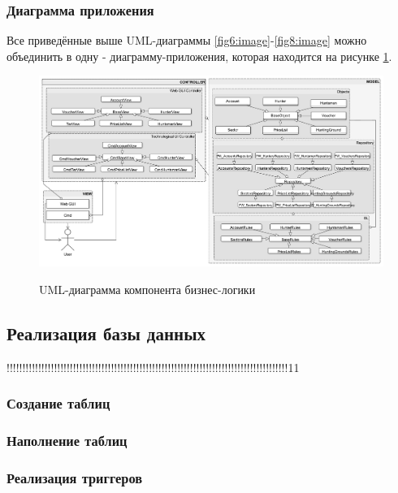 		\subsubsection{Диаграмма приложения}
		Все приведённые выше UML-диаграммы \ref{fig6:image}-\ref{fig8:image} можно объединить в одну - диаграмму-приложения, которая находится на рисунке \ref{fig9:image}.
		
		\begin{figure}[ph!]
			\centering
			\begin{center}
				{\includegraphics[scale=0.44, angle=90]{schemes/uml_full.pdf}}
				\caption{UML-диаграмма компонента бизнес-логики}
				\label{fig9:image}
			\end{center}
		\end{figure}
	\newpage
	
	\subsection{Реализация базы данных}
	!!!!!!!!!!!!!!!!!!!!!!!!!!!!!!!!!!!!!!!!!!!!!!!!!!!!!!!!!!!!!!!!!!!!!!!!!!!!!!!!!!!!!!!!!11
	\subsubsection{Создание таблиц}
	\subsubsection{Наполнение таблиц}
	\subsubsection{Реализация триггеров}
	\subsubsection{}
	
